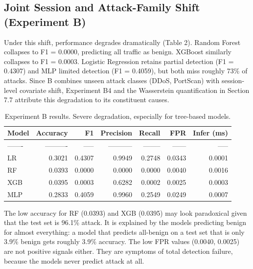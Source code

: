 \documentclass[10pt]{article}
\begin{document}
\subsection{Joint Session and Attack-Family Shift (Experiment B)}
Under this shift, performance degrades dramatically (Table 2). Random Forest collapses to F1 = 0.0000, predicting all traffic as benign. XGBoost similarly collapses to F1 = 0.0003. Logistic Regression retains partial detection (F1 = 0.4307) and MLP limited detection (F1 = 0.4059), but both miss roughly 73\% of attacks. Since B combines unseen attack classes (DDoS, PortScan) with session-level covariate shift, Experiment B4 and the Wasserstein quantification in Section 7.7 attribute this degradation to its constituent causes.
\begin{table}[ht]
\centering
\small
\setlength{\tabcolsep}{5pt}
\caption{Experiment B results. Severe degradation, especially for tree-based models.}
\begin{tabular}{l r r r r r r}
\toprule
Model & Accuracy & F1 & Precision & Recall & FPR & Infer (ms) \\
\midrule
------- & ---------- & ----- & ----------- & -------- & ------ & ----- \\
LR & 0.3021 & 0.4307 & 0.9949 & 0.2748 & 0.0343 & 0.0001 \\
RF & 0.0393 & 0.0000 & 0.0000 & 0.0000 & 0.0040 & 0.0016 \\
XGB & 0.0395 & 0.0003 & 0.6282 & 0.0002 & 0.0025 & 0.0003 \\
MLP & 0.2833 & 0.4059 & 0.9960 & 0.2549 & 0.0249 & 0.0007 \\
\bottomrule
\end{tabular}
\end{table}
The low accuracy for RF (0.0393) and XGB (0.0395) may look paradoxical given that the test set is 96.1\% attack. It is explained by the models predicting benign for almost everything: a model that predicts all-benign on a test set that is only 3.9\% benign gets roughly 3.9\% accuracy. The low FPR values (0.0040, 0.0025) are not positive signals either. They are symptoms of total detection failure, because the models never predict attack at all.
\end{document}
